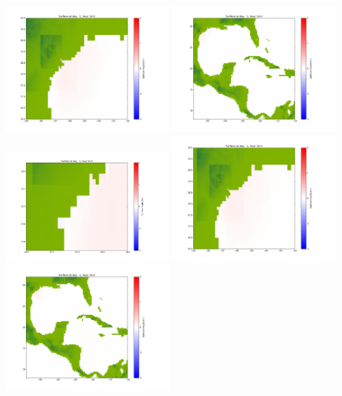 \documentclass[11pt]{article}
\begin{document}
\includegraphics[width=0.475\textwidth]{frame0043fig1002.png}
\vskip 10pt 
\includegraphics[width=0.475\textwidth]{frame0043fig1003.png}
\vskip 10pt 
\includegraphics[width=0.475\textwidth]{frame0044fig1001.png}
\includegraphics[width=0.475\textwidth]{frame0044fig1002.png}
\vskip 10pt 
\includegraphics[width=0.475\textwidth]{frame0044fig1003.png}
\end{document}
